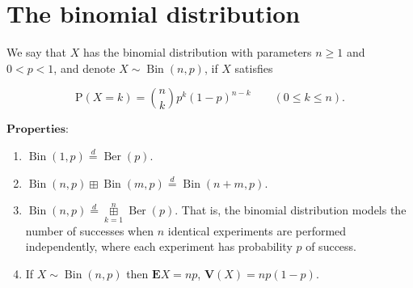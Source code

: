 \section{The binomial distribution}

We say that $X$ has the binomial distribution with
parameters $n\ge 1$ and $0<p<1$, and denote
$X\sim \operatorname{Bin}(n,p)$, if $X$ satisfies

\[
\mathrm{P}(X = k) = \binom{n}{k} p^k (1-p)^{n-k} \qquad (0\le k\le n).
\]

\noindent $\textbf{Properties:}$

\begin{enumerate}[label=\arabic*.]
\item $\operatorname{Bin}(1,p) \stackrel{d}{=}
\operatorname{Ber}(p)$.

\item $\operatorname{Bin}(n,p) \boxplus
\operatorname{Bin}(m,p) \stackrel{d}{=}
\operatorname{Bin}(n+m,p)$.

\item $\operatorname{Bin}(n,p) \stackrel{d}{=}
\mathop{\boxplus}\limits_{k=1}^n
\operatorname{Ber}(p)$.
That is, the binomial distribution models the number
of successes when $n$ identical experiments are
performed independently, where each experiment has
probability $p$ of success.

\item If $X\sim \operatorname{Bin}(n,p)$ then
$\mathbf{E} X = np$, $\mathbf{V}(X) = np(1-p)$.
\end{enumerate}

